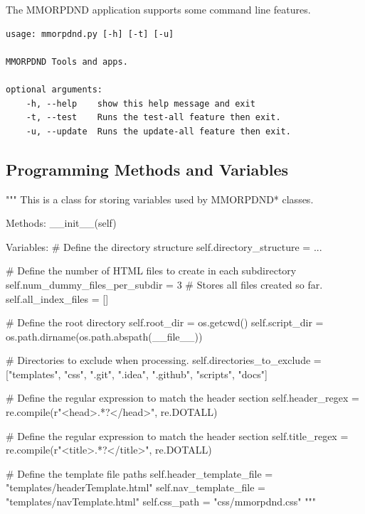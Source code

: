 The MMORPDND application supports some command line features.

\begin{lstlisting}
usage: mmorpdnd.py [-h] [-t] [-u]

MMORPDND Tools and apps.

optional arguments:
	-h, --help    show this help message and exit
	-t, --test    Runs the test-all feature then exit.
	-u, --update  Runs the update-all feature then exit.
\end{lstlisting}















\subsection{Programming Methods and Variables}

\begin{classbox}
"""
This is a class for storing variables used by MMORPDND* classes.
	
Methods:
	__init__(self)
	
Variables:
	# Define the directory structure
	self.directory_structure = { ... }
	
	# Define the number of HTML files to create in each subdirectory
	self.num_dummy_files_per_subdir = 3  # Stores all files created so far.
	self.all_index_files = []
	
	# Define the root directory
	self.root_dir = os.getcwd()
	self.script_dir = os.path.dirname(os.path.abspath(__file__))
	
	# Directories to exclude when processing.
	self.directories_to_exclude = ["templates", "css", ".git", ".idea", ".github", "scripts", "docs"]
	
	# Define the regular expression to match the header section
	self.header_regex = re.compile(r"<head>.*?</head>", re.DOTALL)
	
	# Define the regular expression to match the header section
	self.title_regex = re.compile(r"<title>.*?</title>", re.DOTALL)
	
	# Define the template file paths
	self.header_template_file = "templates/headerTemplate.html"
	self.nav_template_file = "templates/navTemplate.html"
	self.css_path = "css/mmorpdnd.css"
"""
\end{classbox}

